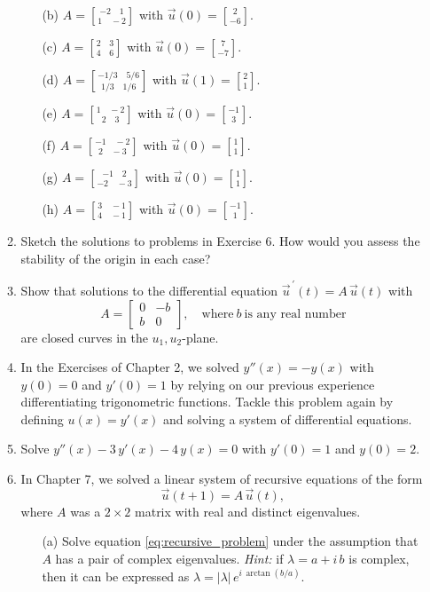 \documentclass[11pt]{article}
\begin{document}
\begin{enumerate}
\begin{enumerate}
\begin{enumerate}
          \item[(b)] $A={-2\quad 1\brack 1\quad -2}$ with $\vec{u}(0) = {2\brack -6}$.
          \item[(c)] $A={2\quad 3\brack 4 \quad 6}$ with $\vec{u}(0) = {7\brack -7}$.
          \item[(d)] $A={-1/3\quad 5/6\brack 1/3 \quad 1/6}$ with $\vec{u}(1) = {2\brack 1}$.
          \item[(e)] $A={1 \quad - 2\brack 2 \quad 3}$ with $\vec{u}(0) = {-1\brack 3}$.
          \item[(f)] $A={-1 \quad - 2\brack 2 \quad -3}$ with $\vec{u}(0) = {1\brack 1}$.
          \item[(g)] $A={-1 \quad 2\brack -2 \quad -3}$ with $\vec{u}(0) = {1\brack 1}$.
          \item[(h)] $A={3 \quad -1\brack 4 \quad -1}$ with $\vec{u}(0) = {-1\brack 1}$.
        \end{enumerate}
      \item Sketch the solutions to problems in Exercise 6. How would you assess the stability of the origin in each case?
      \item Show that solutions to the differential equation $\vec{u}^{\,\prime}(t) = A\, \vec{u}(t)$ with
        \[
          A = \begin{bmatrix}
            0 & -b \\ b & 0
          \end{bmatrix},
          \quad\text{where}\ b \ \text{is any real number}
        \]
        are closed curves in the $u_1,u_2$-plane.
      \item In the Exercises of Chapter 2, we solved $y''(x) = - y(x)$ with $y(0) = 0$ and $y'(0) =1$ by relying on our previous experience differentiating trigonometric functions. Tackle this problem again by defining $u(x) = y'(x)$ and solving a system of differential equations.
      \item Solve $y''(x) - 3 \, y'(x) - 4\, y(x) = 0$ with $y'(0) =1$ and $y(0)=2$.
      \item In Chapter 7, we solved a linear system of recursive equations of the form
        \begin{equation}\label{eq:recursive_problem}
          \vec{u}(t+1) = A \, \vec{u}(t),
        \end{equation}
        where $A$ was a $2\times 2$ matrix with real and distinct eigenvalues.
        \begin{enumerate}
          \item[(a)] Solve equation \eqref{eq:recursive_problem} under the assumption that $A$ has a pair of complex eigenvalues. {\it Hint:} if $\lambda = a + i\, b$ is complex, then it can be expressed as $\lambda = |\lambda|\, e^{i\, \arctan(b/a)}$.

\end{enumerate}
\end{enumerate}
\end{enumerate}
\end{document}
